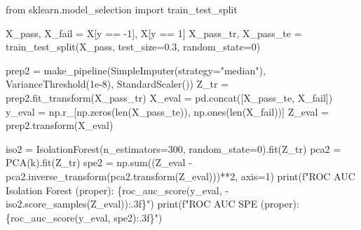\documentclass[
  letterpaper,
  DIV=11,
  numbers=noendperiod]{scrreprt}
\newenvironment{Shaded}{\begin{snugshade}}{\end{snugshade}}
\newcommand{\BuiltInTok}[1]{\textcolor[rgb]{0.00,0.23,0.31}{#1}}
\newcommand{\DecValTok}[1]{\textcolor[rgb]{0.68,0.00,0.00}{#1}}
\newcommand{\FloatTok}[1]{\textcolor[rgb]{0.68,0.00,0.00}{#1}}
\newcommand{\ImportTok}[1]{\textcolor[rgb]{0.00,0.46,0.62}{#1}}
\newcommand{\NormalTok}[1]{\textcolor[rgb]{0.00,0.23,0.31}{#1}}
\newcommand{\OperatorTok}[1]{\textcolor[rgb]{0.37,0.37,0.37}{#1}}
\newcommand{\SpecialCharTok}[1]{\textcolor[rgb]{0.37,0.37,0.37}{#1}}
\newcommand{\SpecialStringTok}[1]{\textcolor[rgb]{0.13,0.47,0.30}{#1}}
\newcommand{\StringTok}[1]{\textcolor[rgb]{0.13,0.47,0.30}{#1}}
\begin{document}
\begin{tcolorbox}[enhanced jigsaw, left=2mm, title=\textcolor{quarto-callout-caution-color}{\faFire}\hspace{0.5em}{Solution to Exercise 1}, opacityback=0, breakable, rightrule=.15mm, arc=.35mm, toptitle=1mm, colbacktitle=quarto-callout-caution-color!10!white, opacitybacktitle=0.6, coltitle=black, colframe=quarto-callout-caution-color-frame, bottomrule=.15mm, leftrule=.75mm, bottomtitle=1mm, titlerule=0mm, toprule=.15mm, colback=white]

\begin{Shaded}
\begin{Highlighting}[]
\ImportTok{from}\NormalTok{ sklearn.model\_selection }\ImportTok{import}\NormalTok{ train\_test\_split}

\NormalTok{X\_pass, X\_fail }\OperatorTok{=}\NormalTok{ X[y }\OperatorTok{==} \OperatorTok{{-}}\DecValTok{1}\NormalTok{], X[y }\OperatorTok{==} \DecValTok{1}\NormalTok{]}
\NormalTok{X\_pass\_tr, X\_pass\_te }\OperatorTok{=}\NormalTok{ train\_test\_split(X\_pass, test\_size}\OperatorTok{=}\FloatTok{0.3}\NormalTok{, random\_state}\OperatorTok{=}\DecValTok{0}\NormalTok{)}

\NormalTok{prep2 }\OperatorTok{=}\NormalTok{ make\_pipeline(SimpleImputer(strategy}\OperatorTok{=}\StringTok{"median"}\NormalTok{), VarianceThreshold(}\FloatTok{1e{-}8}\NormalTok{), StandardScaler())}
\NormalTok{Z\_tr }\OperatorTok{=}\NormalTok{ prep2.fit\_transform(X\_pass\_tr)}
\NormalTok{X\_eval }\OperatorTok{=}\NormalTok{ pd.concat([X\_pass\_te, X\_fail])}
\NormalTok{y\_eval }\OperatorTok{=}\NormalTok{ np.r\_[np.zeros(}\BuiltInTok{len}\NormalTok{(X\_pass\_te)), np.ones(}\BuiltInTok{len}\NormalTok{(X\_fail))]}
\NormalTok{Z\_eval }\OperatorTok{=}\NormalTok{ prep2.transform(X\_eval)}

\NormalTok{iso2 }\OperatorTok{=}\NormalTok{ IsolationForest(n\_estimators}\OperatorTok{=}\DecValTok{300}\NormalTok{, random\_state}\OperatorTok{=}\DecValTok{0}\NormalTok{).fit(Z\_tr)}
\NormalTok{pca2 }\OperatorTok{=}\NormalTok{ PCA(k).fit(Z\_tr)}
\NormalTok{spe2 }\OperatorTok{=}\NormalTok{ np.}\BuiltInTok{sum}\NormalTok{((Z\_eval }\OperatorTok{{-}}\NormalTok{ pca2.inverse\_transform(pca2.transform(Z\_eval)))}\OperatorTok{**}\DecValTok{2}\NormalTok{, axis}\OperatorTok{=}\DecValTok{1}\NormalTok{)}
\BuiltInTok{print}\NormalTok{(}\SpecialStringTok{f"ROC AUC Isolation Forest (proper): }\SpecialCharTok{\{}\NormalTok{roc\_auc\_score(y\_eval, }\OperatorTok{{-}}\NormalTok{iso2.score\_samples(Z\_eval))}\SpecialCharTok{:.3f\}}\SpecialStringTok{"}\NormalTok{)}
\BuiltInTok{print}\NormalTok{(}\SpecialStringTok{f"ROC AUC SPE (proper):              }\SpecialCharTok{\{}\NormalTok{roc\_auc\_score(y\_eval, spe2)}\SpecialCharTok{:.3f\}}\SpecialStringTok{"}\NormalTok{)}
\end{Highlighting}
\end{Shaded}


\end{tcolorbox}
\end{document}
